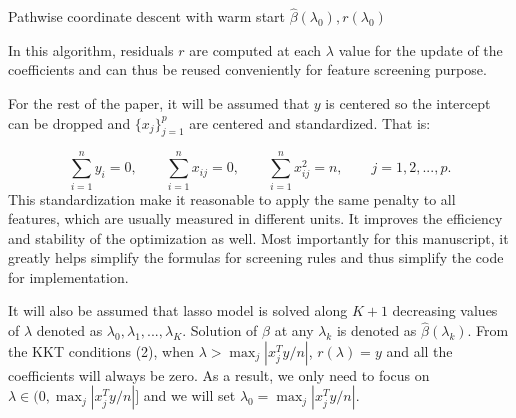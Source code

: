 \documentclass{article}
\begin{document}
\begin{algorithm}[H]
    \SetAlgoLined
    \BlankLine
    \caption{Pathwise coordinate descent with warm start $\hat{\beta}(\lambda_0),r(\lambda_0)$}
\end{algorithm}

\noindent In this algorithm, residuals $r$ are computed at each $\lambda$ value for the update of the coefficients and can thus be reused conveniently for feature screening purpose.

For the rest of the paper, it will be assumed that $y$ is centered so the intercept can be dropped and $\{x_j\}_{j=1}^p$ are centered and standardized. That is:

\begin{equation}
    \sum_{i=1}^ny_i=0, \qquad \sum_{i=1}^n x_{ij}=0, \qquad \sum_{i=1}^n x_{ij}^2=n,\qquad j=1,2,...,p.
\end{equation}
This standardization make it reasonable to apply the same penalty to all features, which are usually measured in different units. It improves the efficiency and stability of the optimization as well. Most importantly for this manuscript, it greatly helps simplify the formulas for screening rules and thus simplify the code for implementation.

It will also be assumed that lasso model is solved along $K+1$ decreasing values of $\lambda$ denoted as $\lambda_0,\lambda_1,...,\lambda_K$. Solution of $\beta$ at any $\lambda_k$ is denoted as $\hat{\beta}(\lambda_k)$. From the KKT conditions (2), when $\lambda>\max_j|x_j^Ty/n|$, $r(\lambda)=y$ and all the coefficients will always be zero. As a result, we only need to focus on $\lambda\in (0,\max_j|x_j^Ty/n|]$ and we will set $\lambda_0=\max_j|x_j^Ty/n|$.
\end{document}

